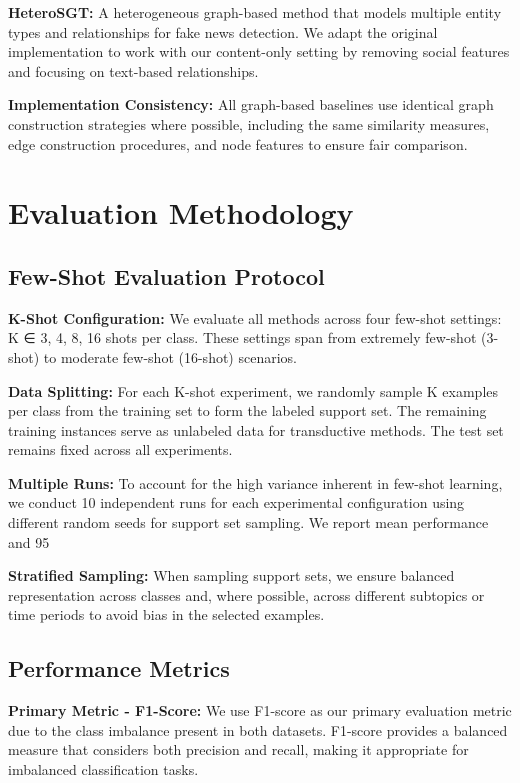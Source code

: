 \textbf{HeteroSGT:} A heterogeneous graph-based method that models multiple entity types and relationships for fake news detection. We adapt the original implementation to work with our content-only setting by removing social features and focusing on text-based relationships.

\textbf{Implementation Consistency:} All graph-based baselines use identical graph construction strategies where possible, including the same similarity measures, edge construction procedures, and node features to ensure fair comparison.

\section{Evaluation Methodology}

\subsection{Few-Shot Evaluation Protocol}

\textbf{K-Shot Configuration:} We evaluate all methods across four few-shot settings: K ∈ {3, 4, 8, 16} shots per class. These settings span from extremely few-shot (3-shot) to moderate few-shot (16-shot) scenarios.

\textbf{Data Splitting:} For each K-shot experiment, we randomly sample K examples per class from the training set to form the labeled support set. The remaining training instances serve as unlabeled data for transductive methods. The test set remains fixed across all experiments.

\textbf{Multiple Runs:} To account for the high variance inherent in few-shot learning, we conduct 10 independent runs for each experimental configuration using different random seeds for support set sampling. We report mean performance and 95%

\textbf{Stratified Sampling:} When sampling support sets, we ensure balanced representation across classes and, where possible, across different subtopics or time periods to avoid bias in the selected examples.

\subsection{Performance Metrics}

\textbf{Primary Metric - F1-Score:} We use F1-score as our primary evaluation metric due to the class imbalance present in both datasets. F1-score provides a balanced measure that considers both precision and recall, making it appropriate for imbalanced classification tasks.

